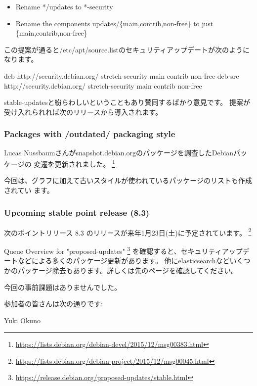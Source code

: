 \documentclass[mingoth,a4paper]{jsarticle}
\begin{document}
\begin{itemize}
\item Rename */updates to *-security
\item Rename the components updates/\{main,contrib,non-free\} to just \{main,contrib,non-free\}
\end{itemize}

この提案が通ると/etc/apt/source.listのセキュリティアップデートが次のようになります。

\begin{commandline}
deb http://security.debian.org/ stretch-security main contrib non-free
deb-src http://security.debian.org/ stretch-security main contrib non-free
\end{commandline}

stable-updatesと紛らわしいということもあり賛同するばかり意見です。
提案が受け入れられれば次のリリースから導入されます。


\subsubsection{Packages with /outdated/ packaging style}

Lucas Nussbaumさんがsnapshot.debian.orgのパッケージを調査したDebianパッケージの
変遷を更新されました。
\footnote{\url{https://lists.debian.org/debian-devel/2015/12/msg00383.html}}

今回は、グラフに加えて古いスタイルが使われているパッケージのリストも作成されてい
ます。


\subsubsection{Upcoming stable point release (8.3)}

次のポイントリリース 8.3 のリリースが来年1月23日(土)に予定されています。
\footnote{\url{https://lists.debian.org/debian-project/2015/12/msg00045.html}}

Queue Overview for "proposed-updates"
\footnote{\url{https://release.debian.org/proposed-updates/stable.html}}
を確認すると、セキュリティアップデートなどによる多くのパッケージ更新があります。
他にelasticsearchなどいくつかのパッケージ除去もあります。詳しくは先のページを確認してください。



今回の事前課題はありませんでした。

参加者の皆さんは次の通りです:

\begin{prework}{ Yuki Okuno }
\end{prework}
\end{document}
